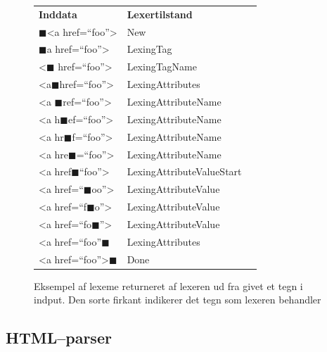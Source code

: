 \documentclass[a4paper,oneside]{memoir}
\begin{document}
\begin{figure}[h]
  \begin{tabular}{lll}
\textbf{Inddata} &
\textbf{Lexertilstand} \\

$\blacksquare$<a href=``foo''> & New \\
\hspace*{10pt}$\blacksquare$a href=``foo''> & LexingTag \\
\hspace*{10pt}<$\blacksquare$ href=``foo''> & LexingTagName \\
\hspace*{10pt}<a$\blacksquare$href=``foo''> & LexingAttributes \\
\hspace*{10pt}<a $\blacksquare$ref=``foo''> & LexingAttributeName \\
\hspace*{10pt}<a h$\blacksquare$ef=``foo''> & LexingAttributeName \\
\hspace*{10pt}<a hr$\blacksquare$f=``foo''> & LexingAttributeName \\
\hspace*{10pt}<a hre$\blacksquare$=``foo''> & LexingAttributeName \\
\hspace*{10pt}<a href$\blacksquare$``foo''> & LexingAttributeValueStart \\
\hspace*{10pt}<a href=``$\blacksquare$oo''> & LexingAttributeValue \\
\hspace*{10pt}<a href=``f$\blacksquare$o''> & LexingAttributeValue \\
\hspace*{10pt}<a href=``fo$\blacksquare$''> & LexingAttributeValue \\
\hspace*{10pt}<a href=``foo''$\blacksquare$ & LexingAttributes \\
\hspace*{10pt}<a href=``foo''>$\blacksquare$ & Done \\
\end{tabular}
  \caption{Eksempel af lexeme returneret af lexeren ud fra givet et tegn
i indput. Den sorte firkant indikerer det tegn som lexeren behandler}
  \label{ekslexeroutput}
\end{figure}

\subsection{HTML--parser}
\end{document}
